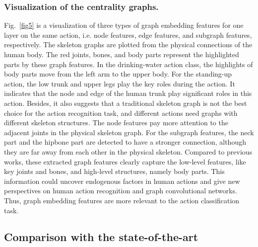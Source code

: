 \documentclass[journal]{IEEEtran}
\begin{document}
\subsubsection{Visualization of the centrality graphs.}

Fig.~\ref{fig5} is a visualization of three types of graph embedding features for one layer on the same action, i.e. node features, edge features, and subgraph features, respectively. The skeleton graphs are plotted from the physical connections of the human body. The red joints, bones, and body parts represent the highlighted parts by these graph features. In the drinking-water action class, the highlights of body parts move from the left arm to the upper body. For the standing-up action, the low trunk and upper legs play the key roles during the action. It indicates that the node and edge of the human trunk play significant roles in this action. Besides, it also suggests that a traditional skeleton graph is not the best choice for the action recognition task, and different actions need graphs with different skeleton structures. The node features pay more attention to the adjacent joints in the physical skeleton graph. For the subgraph features, the neck part and the hipbone part are detected to have a stronger connection, although they are far away from each other in the physical skeleton. Compared to previous works, these extracted graph features clearly capture the low-level features, like key joints and bones, and high-level structures, namely body parts. This information could uncover endogenous factors in human actions and give new perspectives on human action recognition and graph convolutional networks. Thus, graph embedding features are more relevant to the action classification task.

\subsection{Comparison with the state-of-the-art}
\end{document}
